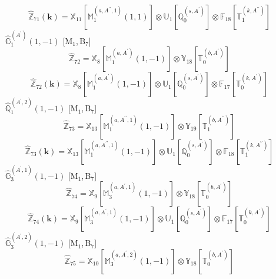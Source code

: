 \documentclass[fleqn,10pt,landscape]{article}
\begin{document}
\begin{itemize}
\begin{dmath*}
\hat{\mathbb{Z}}_{71}(\bm{k})=\mathbb{X}_{11}[\mathbb{M}_{1}^{(a,A^{\prime\prime},1)}(1,1)] \otimes\mathbb{U}_{1}[\mathbb{Q}_{0}^{(s,A^{\prime})}] \otimes\mathbb{F}_{18}[\mathbb{T}_{1}^{(k,A^{\prime\prime})}]
\end{dmath*}
\vspace{4mm}
\noindent {} $\,\,\,\hat{\mathbb{G}}_{1}^{(A^{\prime})}(1,-1)$ [M$_{1}$,\,B$_{7}$]
\begin{dmath*}
\hat{\mathbb{Z}}_{72}=\mathbb{X}_{8}[\mathbb{M}_{1}^{(a,A^{\prime})}(1,-1)] \otimes\mathbb{Y}_{18}[\mathbb{T}_{0}^{(b,A^{\prime})}]
\end{dmath*}
\begin{dmath*}
\hat{\mathbb{Z}}_{72}(\bm{k})=\mathbb{X}_{8}[\mathbb{M}_{1}^{(a,A^{\prime})}(1,-1)] \otimes\mathbb{U}_{1}[\mathbb{Q}_{0}^{(s,A^{\prime})}] \otimes\mathbb{F}_{17}[\mathbb{T}_{0}^{(k,A^{\prime})}]
\end{dmath*}
\vspace{4mm}
\noindent {} $\,\,\,\hat{\mathbb{Q}}_{1}^{(A^{\prime},2)}(1,-1)$ [M$_{1}$,\,B$_{7}$]
\begin{dmath*}
\hat{\mathbb{Z}}_{73}=\mathbb{X}_{13}[\mathbb{M}_{1}^{(a,A^{\prime\prime},1)}(1,-1)] \otimes\mathbb{Y}_{19}[\mathbb{T}_{1}^{(b,A^{\prime\prime})}]
\end{dmath*}
\begin{dmath*}
\hat{\mathbb{Z}}_{73}(\bm{k})=\mathbb{X}_{13}[\mathbb{M}_{1}^{(a,A^{\prime\prime},1)}(1,-1)] \otimes\mathbb{U}_{1}[\mathbb{Q}_{0}^{(s,A^{\prime})}] \otimes\mathbb{F}_{18}[\mathbb{T}_{1}^{(k,A^{\prime\prime})}]
\end{dmath*}
\vspace{4mm}
\noindent {} $\,\,\,\hat{\mathbb{G}}_{3}^{(A^{\prime},1)}(1,-1)$ [M$_{1}$,\,B$_{7}$]
\begin{dmath*}
\hat{\mathbb{Z}}_{74}=\mathbb{X}_{9}[\mathbb{M}_{3}^{(a,A^{\prime},1)}(1,-1)] \otimes\mathbb{Y}_{18}[\mathbb{T}_{0}^{(b,A^{\prime})}]
\end{dmath*}
\begin{dmath*}
\hat{\mathbb{Z}}_{74}(\bm{k})=\mathbb{X}_{9}[\mathbb{M}_{3}^{(a,A^{\prime},1)}(1,-1)] \otimes\mathbb{U}_{1}[\mathbb{Q}_{0}^{(s,A^{\prime})}] \otimes\mathbb{F}_{17}[\mathbb{T}_{0}^{(k,A^{\prime})}]
\end{dmath*}
\vspace{4mm}
\noindent {} $\,\,\,\hat{\mathbb{G}}_{3}^{(A^{\prime},2)}(1,-1)$ [M$_{1}$,\,B$_{7}$]
\begin{dmath*}
\hat{\mathbb{Z}}_{75}=\mathbb{X}_{10}[\mathbb{M}_{3}^{(a,A^{\prime},2)}(1,-1)] \otimes\mathbb{Y}_{18}[\mathbb{T}_{0}^{(b,A^{\prime})}]

\end{dmath*}
\end{itemize}
\end{document}
